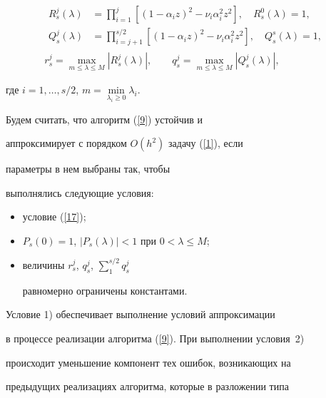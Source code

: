 \begin{gather*}


\begin{align*}


R^j_s(\lambda) &= \prod^{j}_{i=1}


[(1-\alpha_{i}z)^2-\nu_{i}\alpha^2_{i}z^2], \quad R^0_s(\lambda)=1,\\


Q^j_s(\lambda)&= \prod\limits^{s/2}_{i=j+1}


[(1-\alpha_{i}z)^2-\nu_{i}\alpha^2_{i}z^2], \quad Q^s_s(\lambda)=1,


\end{align*}


\\


r^j_s= \max_{m\le \lambda \le M} |R^j_s(\lambda)|,\qquad


q^j_s= \max_{m\le \lambda \le M} |Q^j_s(\lambda)|,


\end{gather*}




где $i=1,\dotsc,s/2$, $m = \min\limits_{\lambda_i\ge 0} \lambda_i$.


Будем считать, что алгоритм (\ref{9}) устойчив и


аппроксимирует с порядком $O(h^2)$ задачу (\ref{1}), если


параметры в нем выбраны так, чтобы


выполнялись следующие условия:


\begin{itemize}


\item[1)] условие (\ref{17});


\item[2)] $P_s(0)=1$, $|P_s(\lambda)|<1$ при $0<\lambda\le M$;


\item[3)] величины $r^j_s$, $q^j_s$, $\sum\limits_1^{s/2} q^j_s$


равномерно ограничены константами.


\end{itemize}


Условие 1) обеспечивает выполнение условий аппроксимации


в процессе реализации алгоритма (\ref{9}). При выполнении условия~2)


происходит уменьшение компонент тех ошибок, возникающих на


предыдущих реализациях алгоритма, которые в разложении типа


